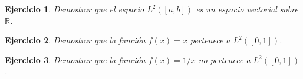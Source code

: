\documentclass[11pt]{report}
\newtheorem{ex}{Ejercicio}
\newenvironment{solution}{\begin{proof}[Solución]}{\end{proof}}
\newcommand{\Ldos}{L^2}
\begin{document}
\begin{ex}
Demostrar que el espacio $\Ldos([a, b])$ es un espacio vectorial sobre $\mathbb{R}$.
\end{ex}







\begin{ex}
Demostrar que la función $f(x) = x$ pertenece a $\Ldos([0, 1])$.
\end{ex}


\begin{ex}
Demostrar que la función $f(x) = {1}/{x}$ no pertenece a $\Ldos([0, 1])$.
\end{ex}
\end{document}
